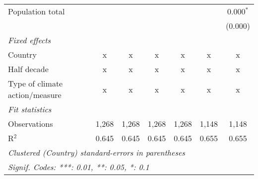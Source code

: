 \begin{tabular}{lcccccc}
   Population total                              &         &         &         &         &         & 0.000$^{*}$\\   
                                                 &         &         &         &         &         & (0.000)\\   
   \emph{Fixed effects}\\
   Country                                       & x       & x       & x       & x       & x       & x\\  
   Half decade                                   & x       & x       & x       & x       & x       & x\\  
   Type of climate action/measure                & x       & x       & x       & x       & x       & x\\  
   \midrule \emph{Fit statistics}\\
   Observations                                  & 1,268   & 1,268   & 1,268   & 1,268   & 1,148   & 1,148\\  
   R$^2$                                         & 0.645   & 0.645   & 0.645   & 0.645   & 0.655   & 0.655\\  
   \midrule
   \multicolumn{7}{l}{\emph{Clustered (Country) standard-errors in parentheses}}\\
   \multicolumn{7}{l}{\emph{Signif. Codes: ***: 0.01, **: 0.05, *: 0.1}}\\
\end{tabular}
\par\endgroup


